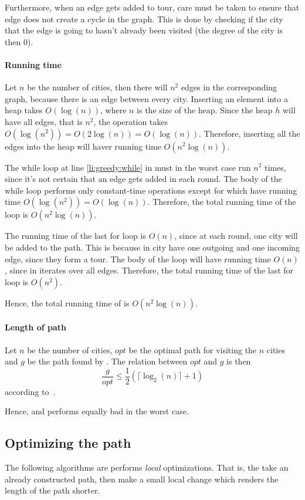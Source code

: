 Furthermore, when an edge gets added to tour, care must be taken to ensure that
edge does not create a cycle in the graph. This is done by checking if the city
that the edge is going to hasn't already been visited (the degree of the city
is then 0).

\paragraph{Running time}
Let $n$ be the number of cities, then there will $n^2$ edges in the
corresponding graph, because there is an edge between every city.
Inserting an element into a heap takes $O(\log(n))$, where $n$ is the size of
the heap. Since the heap $h$ will have all edges, that is $n^2$, the
 operation takes $O(\log(n^2)) = O(2\log(n)) = O(\log(n))$.
Therefore, inserting all the edges into the heap will haver running time
$O(n^2\log(n))$. 

The while loop at line \ref{li:greedy:while} in
 must in the worst case run $n^2$ times, since it's not certain
that an edge gets added in each round. The body of the while loop performs
only constant-time operations except for  which have
running time $O(\log(n^2)) = O(\log(n))$. Therefore, the total running time of
the loop is $O(n^2\log(n))$.

The running time of the last for loop is $O(n)$, since at each round, one city
will be added to the path. This is because in city have one outgoing and one
incoming edge, since they form a tour. The body of the loop will have running
time $O(n)$, since in iterates over all edges. Therefore,
the total running time of the last for loop is $O(n^2)$.

Hence, the total running time of  is $O(n^2\log(n))$.

\paragraph{Length of path}
Let $n$ be the number of cities, $opt$ be the optimal path for visiting the $n$
cities and $g$ be the path
found by . The relation between $opt$ and $g$ is then
\[\frac{g}{opt} \leq \frac{1}{2}(\lceil \log_2(n) \rceil + 1)\]
according to~\cite{johnson}. 

Hence,  and  performs equally bad in the
worst case.

\subsection{Optimizing the path}
\label{sec:optimizing_the_path}
The following algorithms are performs \emph{local} optimizations. That is, the
take an already constructed path, then make a small local change which renders
the length of the path shorter.

